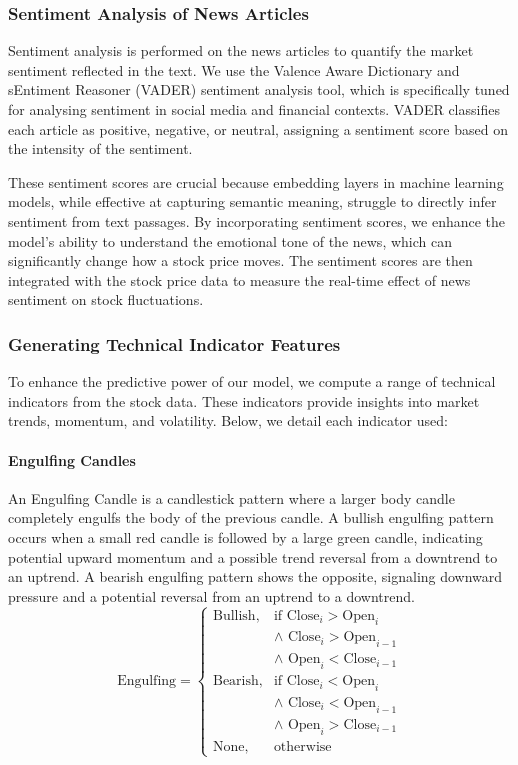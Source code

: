\documentclass[conference]{IEEEtran}
\begin{document}
\subsubsection{Sentiment Analysis of News Articles}
Sentiment analysis is performed on the news articles to quantify the market sentiment reflected in the text. We use the Valence Aware Dictionary and sEntiment Reasoner (VADER) sentiment analysis tool, which is specifically tuned for analysing sentiment in social media and financial contexts. VADER classifies each article as positive, negative, or neutral, assigning a sentiment score based on the intensity of the sentiment.

These sentiment scores are crucial because embedding layers in machine learning models, while effective at capturing semantic meaning, struggle to directly infer sentiment from text passages. By incorporating sentiment scores, we enhance the model’s ability to understand the emotional tone of the news, which can significantly change how a stock price moves. The sentiment scores are then integrated with the stock price data to measure the real-time effect of news sentiment on stock fluctuations.

\subsubsection{Generating Technical Indicator Features}
To enhance the predictive power of our model, we compute a range of technical indicators from the stock data. These indicators provide insights into market trends, momentum, and volatility. Below, we detail each indicator used:

\paragraph{Engulfing Candles}
An Engulfing Candle is a candlestick pattern where a larger body candle completely engulfs the body of the previous candle. A bullish engulfing pattern occurs when a small red candle is followed by a large green candle, indicating potential upward momentum and a possible trend reversal from a downtrend to an uptrend. A bearish engulfing pattern shows the opposite, signaling downward pressure and a potential reversal from an uptrend to a downtrend.
\[
\text{Engulfing} = 
\begin{cases}
\text{Bullish}, & \text{if} \text{ Close}_{i} > \text{Open}_{i} \\
& \land \text{ Close}_{i} > \text{Open}_{i-1} \\
& \land \text{ Open}_{i} < \text{Close}_{i-1} \\
\text{Bearish}, & \text{if} \text{ Close}_{i} < \text{Open}_{i} \\
& \land \text{ Close}_{i} < \text{Open}_{i-1} \\
& \land \text{ Open}_{i} > \text{Close}_{i-1} \\
\text{None}, & \text{otherwise}
\end{cases}
\]
\end{document}
